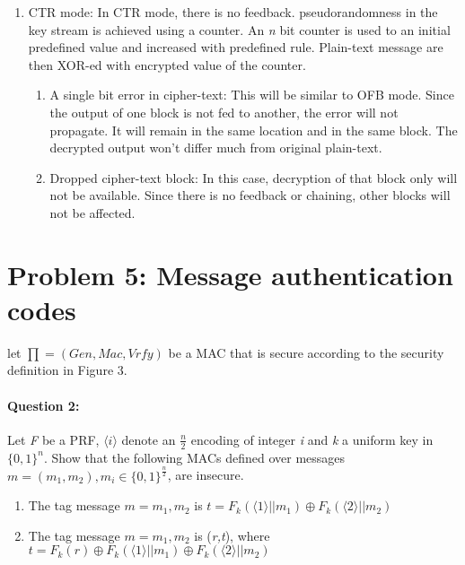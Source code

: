 \documentclass{article}
\begin{document}
\begin{enumerate}
\begin{enumerate}
            \end{enumerate}
        \item CTR mode: In CTR mode, there is no feedback. pseudorandomness in the key stream is achieved using a counter. An \emph{n} bit counter is used to an initial predefined value and increased with predefined rule. Plain-text message are then XOR-ed with encrypted value of the counter.
            \begin{enumerate}
                \item A single bit error in cipher-text:\newline
                    This will be similar to OFB mode. Since the output of one block is not fed to another, the error will not propagate. It will remain in the same location and in the same block. The decrypted output won't differ much from original plain-text.
                \item Dropped cipher-text block: \newline
                In this case, decryption of that block only will not be available. Since there is no feedback or chaining, other blocks will not be affected.            
            \end{enumerate}
    \end{enumerate}

\section{Problem 5: Message authentication codes}
    
    let $\prod = (Gen,Mac,Vrfy)$ be a MAC that is secure according to the security definition in Figure 3.
    
    \paragraph{Question 2:} Let \emph{F} be a PRF, $\langle i \rangle$ denote an $\frac{n}{2}$ encoding of integer \emph{i} and \emph{k} a uniform key in ${\{0,1\}}^n$. Show that the following MACs defined over messages $m=(m_1,m_2), m_i \in {\{0,1\}}^{\frac{n}{2}}$, are insecure.
        \begin{enumerate}
            \item The tag message $m = m_1,m_2$ is $t={F_k}(\langle 1 \rangle || {m_1}) \oplus {F_k}(\langle 2 \rangle || {m_2})$
            \item The tag message $m = m_1,m_2$ is (\emph{r,t}), where $t={F_k}(r)\oplus {F_k}(\langle 1 \rangle || {m_1}) \oplus {F_k}(\langle 2 \rangle || {m_2})$
        \end{enumerate}
        
\end{document}
